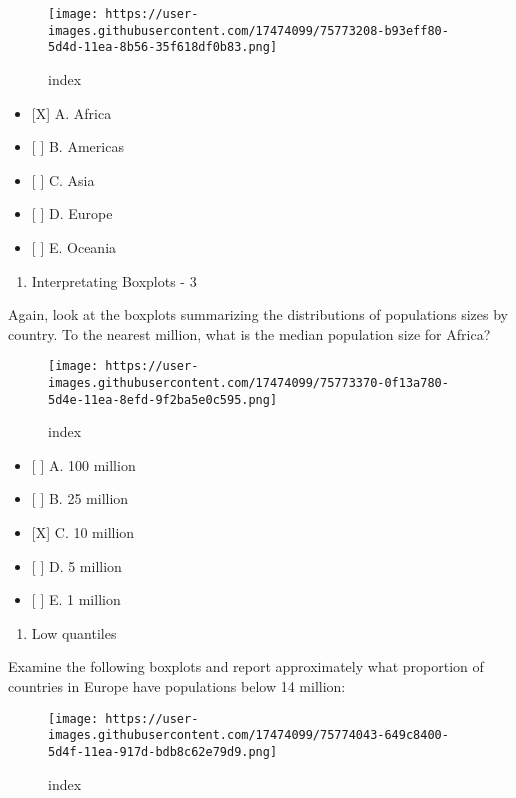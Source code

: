 \documentclass[]{article}
\providecommand{\tightlist}{%
  \setlength{\itemsep}{0pt}\setlength{\parskip}{0pt}}
\begin{document}
\begin{figure}
\centering
\texttt{[image: https://user-images.githubusercontent.com/17474099/75773208-b93eff80-5d4d-11ea-8b56-35f618df0b83.png]}
\caption{index}
\end{figure}

\begin{itemize}
\tightlist
\item
  {[}X{]} A. Africa
\item
  {[} {]} B. Americas
\item
  {[} {]} C. Asia
\item
  {[} {]} D. Europe
\item
  {[} {]} E. Oceania
\end{itemize}

\begin{enumerate}
\def\labelenumi{\arabic{enumi}.}
\setcounter{enumi}{4}
\tightlist
\item
  Interpretating Boxplots - 3
\end{enumerate}

Again, look at the boxplots summarizing the distributions of populations
sizes by country. To the nearest million, what is the median population
size for Africa?

\begin{figure}
\centering
\texttt{[image: https://user-images.githubusercontent.com/17474099/75773370-0f13a780-5d4e-11ea-8efd-9f2ba5e0c595.png]}
\caption{index}
\end{figure}

\begin{itemize}
\tightlist
\item
  {[} {]} A. 100 million
\item
  {[} {]} B. 25 million
\item
  {[}X{]} C. 10 million
\item
  {[} {]} D. 5 million
\item
  {[} {]} E. 1 million
\end{itemize}

\begin{enumerate}
\def\labelenumi{\arabic{enumi}.}
\setcounter{enumi}{5}
\tightlist
\item
  Low quantiles
\end{enumerate}

Examine the following boxplots and report approximately what proportion
of countries in Europe have populations below 14 million:

\begin{figure}
\centering
\texttt{[image: https://user-images.githubusercontent.com/17474099/75774043-649c8400-5d4f-11ea-917d-bdb8c62e79d9.png]}
\caption{index}
\end{figure}
\end{document}
